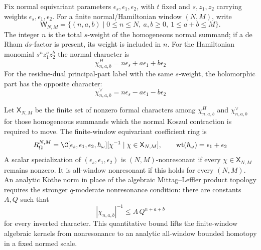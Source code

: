 \begin{defn}\label{defn:wt-omega-normal-window}
  Fix normal equivariant parameters
  \(\epsilon_s,\epsilon_1,\epsilon_2\), with \(t\) fixed and
  \(s,z_1,z_2\) carrying weights
  \(\epsilon_s,\epsilon_1,\epsilon_2\).  For a finite normal/Hamiltonian
  window \((N,M)\), write
  \[
    \mathsf W_{N,M}
      =
    \{(n,a,b)\mid 0\leq n\leq N,\ a,b\geq0,\ 1\leq a+b\leq M\}.
  \]
  The integer \(n\) is the total \(s\)-weight of the homogeneous normal
  summand; if a de Rham \(ds\)-factor is present, its weight is included in
  \(n\).  For the Hamiltonian monomial \(s^n z_1^{a}z_2^{b}\) the normal
  character is
  \begin{equation}\label{eq:wt-omega-hamiltonian-character}
    \chi^H_{n,a,b}
      =
    n\epsilon_s+a\epsilon_1+b\epsilon_2
  \end{equation}
  For the residue-dual principal-part label with the same \(s\)-weight,
  the holomorphic part has the opposite character:
  \begin{equation}\label{eq:wt-omega-cotangent-character}
    \chi^\vee_{n,a,b}
      =
    n\epsilon_s-a\epsilon_1-b\epsilon_2
  \end{equation}

  Let \(\mathsf X_{N,M}\) be the finite set of nonzero formal characters
  among \(\chi^H_{n,a,b}\) and \(\chi^\vee_{n,a,b}\) for those homogeneous
  summands which the normal Koszul contraction is required to move.  The
  finite-window equivariant coefficient ring is
  \[
    R_{\Omega}^{N,M}
      =
    \C[\epsilon_s,\epsilon_1,\epsilon_2,\hbar_\omega]
    [\chi^{-1}\mid \chi\in\mathsf X_{N,M}],
    \qquad
    \operatorname{wt}(\hbar_\omega)=\epsilon_1+\epsilon_2
  \]
  A scalar specialization of
  \((\epsilon_s,\epsilon_1,\epsilon_2)\) is
  \((N,M)\)-nonresonant if every \(\chi\in\mathsf X_{N,M}\) remains
  nonzero.  It is all-window nonresonant if this holds for every
  \((N,M)\).  An analytic K\"othe norm in place of the algebraic
  Mittag--Leffler product topology requires the stronger
  \(q\)-moderate nonresonance condition:
  there are constants \(A,Q\) such that
  \[
    |\chi_{n,a,b}|^{-1}\leq A\,Q^{n+a+b}
  \]
  for every inverted character.  This quantitative bound lifts the
  finite-window algebraic kernels from nonresonance to an analytic
  all-window bounded homotopy in a fixed normed scale.
\end{defn}

